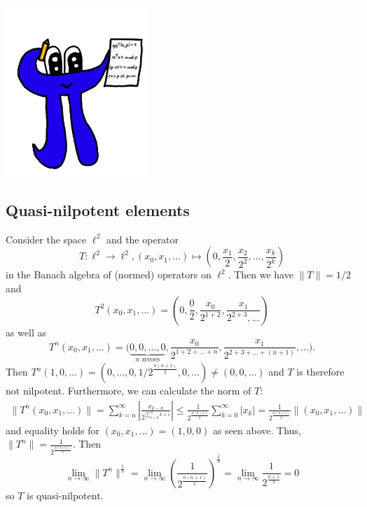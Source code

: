 \documentclass[a4paper]{article}
\begin{document}
\makeexheadereng

\begin{center}
    \includegraphics*[width=0.4\textwidth]{pi.png}
\end{center}


\setcounter{subsection}{2}
\subsection{Quasi-nilpotent elements}

Consider the space $\ell^2$  and the operator
\begin{equation*}
    T: \ell^2 \to \ell^2, (x_0, x_1, \dots) \mapsto \left(0, \frac{x_1}{2}, \frac{x_2}{2^2}, \dots, \frac{x_k}{2^k}\right)
\end{equation*}
in the Banach algebra of (normed) operators on $\ell^2$. Then we have $\|T\| = 1/2$ and
\begin{equation*}
    T^2(x_0, x_1, \dots) = \left(0, \frac{0}{2}, \frac{x_0}{2^{1+2}}, \frac{x_1}{2^{2 + 3}, \dots}\right)
\end{equation*}
as well as
\begin{equation*}
    T^n(x_0, x_1, \dots) = \bigg(\underbrace{0, 0, \dots, 0}_{n \text{ zeroes}}, \frac{x_0}{2^{1 + 2 + \dots + n}}, \frac{x_1}{2^{2 + 3 + \dots + (n+1)}}, \dots \bigg)\text{.}
\end{equation*}
Then $T^n(1, 0, \dots) = (0, \dots, 0, 1/2^{\frac{n(n+1)}{2}}, 0, \dots) \neq (0, 0, \dots)$ and $T$ is therefore not nilpotent.
Furthermore, we can calculate the norm of $T$:
\begin{align*}
    \|T^n(x_0, x_1, \dots)\| =\sum_{k = n}^{\infty} \left| \frac{x_{k-n}}{2^{\sum_{i=0}^n k+i}}  \right| \leq \frac{1}{2^{\frac{n(n+1)}{2}}} \sum_{k=0}^{\infty} \left| x_k \right| = \frac{1}{2^{\frac{n(n+1)}{2}}} \|(x_0, x_1, \dots)\|
\end{align*}
and equality holds for $(x_0, x_1, \dots) = (1, 0, 0)$ as seen above. Thus, $\|T^n\| = \frac{1}{2^{\frac{n(n+1)}{2}}}$.
Then
\begin{equation*}
    \lim_{n \to \infty} \| T^n \|^{\frac{1}{n}} 
    = \lim_{n \to \infty} \left(\frac{1}{2^{\frac{n(n+1)}{2}}} \right)^{\frac{1}{n}}
    = \lim_{n \to \infty} \frac{1}{2^{\frac{n+1}{2}}} 
    = 0
\end{equation*}
so $T$ is quasi-nilpotent.
\end{document}
